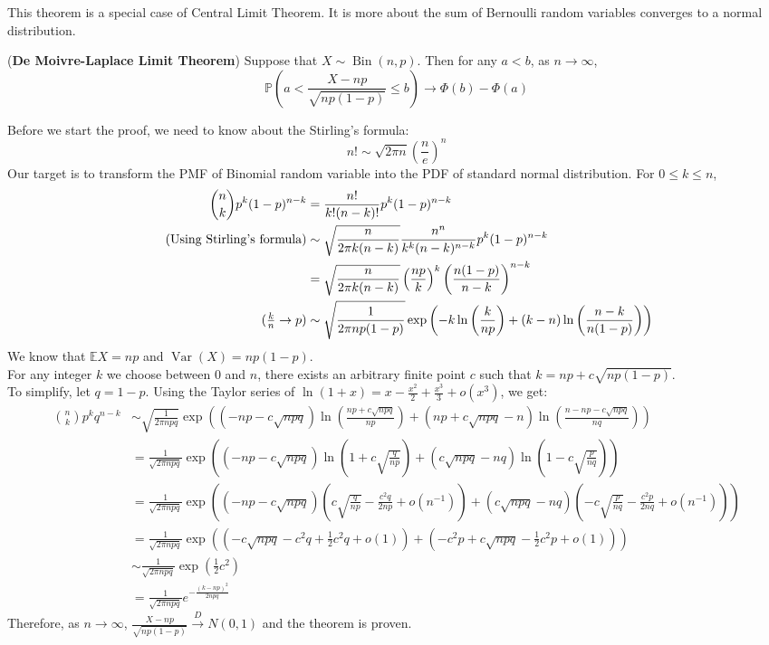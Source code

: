 \documentclass{huhtakm-template-book}
\newcommand{\prob}{\mathbb{P}}
\newcommand{\expect}{\mathbb{E}}
\DeclareMathOperator{\Bin}{Bin}
\DeclareMathOperator{\Var}{Var}
\begin{document}
This theorem is a special case of Central Limit Theorem. It is more about the sum of Bernoulli random variables converges to a normal distribution.
\begin{thm}(\textbf{De Moivre-Laplace Limit Theorem}) Suppose that $X\sim\Bin(n,p)$. Then for any $a<b$, as $n\to\infty$,
	\begin{equation*}
		\prob\left(a<\frac{X-np}{\sqrt{np(1-p)}}\leq b\right)\to\Phi(b)-\Phi(a)
	\end{equation*}	
\end{thm}
\begin{proofing}
	Before we start the proof, we need to know about the Stirling's formula:
	\begin{equation*}
		n!\sim\sqrt{2\pi n}\left(\frac{n}{e}\right)^{n}
	\end{equation*}
	Our target is to transform the PMF of Binomial random variable into the PDF of standard normal distribution. For $0\leq k\leq n$,
	\begin{align*}
		\binom{n}{k}p^{k}(1-p)^{n-k}&=\frac{n!}{k!(n-k)!}p^{k}(1-p)^{n-k}\\
		\tag{Using Stirling's formula}
		&\sim\sqrt{\frac{n}{2\pi k(n-k)}}\frac{n^{n}}{k^{k}(n-k)^{n-k}}p^{k}(1-p)^{n-k}\\
		&=\sqrt{\frac{n}{2\pi k(n-k)}}\left(\frac{np}{k}\right)^{k}\left(\frac{n(1-p)}{n-k}\right)^{n-k}\\
		\tag{$\frac{k}{n}\to p$}
		&\sim\sqrt{\frac{1}{2\pi np(1-p)}}\exp\left(-k\ln\left(\frac{k}{np}\right)+(k-n)\ln\left(\frac{n-k}{n(1-p)}\right)\right)
	\end{align*}
	We know that $\expect{X}=np$ and $\Var(X)=np(1-p)$.\\
	For any integer $k$ we choose between $0$ and $n$, there exists an arbitrary finite point $c$ such that $k=np+c\sqrt{np(1-p)}$.\\
	To simplify, let $q=1-p$. Using the Taylor series of $\ln(1+x)=x-\frac{x^{2}}{2}+\frac{x^{3}}{3}+o(x^{3})$, we get:
	\begin{align*}
		\binom{n}{k}p^{k}q^{n-k}&\sim\sqrt{\frac{1}{2\pi npq}}\exp\left((-np-c\sqrt{npq})\ln\left(\frac{np+c\sqrt{npq}}{np}\right)+(np+c\sqrt{npq}-n)\ln\left(\frac{n-np-c\sqrt{npq}}{nq}\right)\right)\\
		&=\frac{1}{\sqrt{2\pi npq}}\exp\left((-np-c\sqrt{npq})\ln\left(1+c\sqrt{\frac{q}{np}}\right)+(c\sqrt{npq}-nq)\ln\left(1-c\sqrt{\frac{p}{nq}}\right)\right)\\
		&=\frac{1}{\sqrt{2\pi npq}}\exp\left((-np-c\sqrt{npq})\left(c\sqrt{\frac{q}{np}}-\frac{c^{2}q}{2np}+o(n^{-1})\right)+(c\sqrt{npq}-nq)\left(-c\sqrt{\frac{p}{nq}}-\frac{c^{2}p}{2nq}+o(n^{-1})\right)\right)\\
		&=\frac{1}{\sqrt{2\pi npq}}\exp\left((-c\sqrt{npq}-c^{2}q+\frac{1}{2}c^{2}q+o(1))+(-c^{2}p+c\sqrt{npq}-\frac{1}{2}c^{2}p+o(1))\right)\\
		&\sim\frac{1}{\sqrt{2\pi npq}}\exp\left(\frac{1}{2}c^{2}\right)\\
		&=\frac{1}{\sqrt{2\pi npq}}e^{-\frac{(k-np)^{2}}{2npq}}
	\end{align*}
	Therefore, as $n\to\infty$, $\frac{X-np}{\sqrt{np(1-p)}}\xrightarrow{D}N(0,1)$ and the theorem is proven.
\end{proofing}
\end{document}
